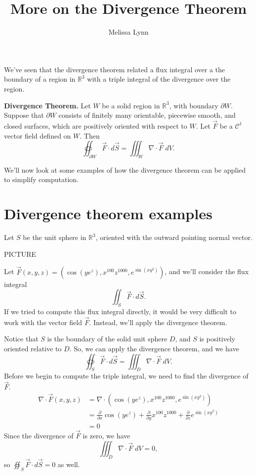 \documentclass{ximera}
\title{More on the Divergence Theorem}
\author{Melissa Lynn}
\begin{document}
  
\begin{abstract}  
\end{abstract}  
\maketitle 

We've seen that the divergence theorem related a flux integral over a the boundary of a region in $\mathbb{R}^3$ with a triple integral of the divergence over the region.

\begin{theorem}
\textbf{Divergence Theorem.} Let $W$ be a solid region in $\mathbb{R}^3$, with boundary $\partial W$. Suppose that $\partial W$ consists of finitely many orientable, piecewise smooth, and closed surfaces, which are positively oriented with respect to $W$. Let $\vec{F}$ be a $\mathcal{C}^1$ vector field defined on $W$. Then
\[
\oiint_{\partial W} \vec{F}\cdot d\vec{S} = \iiint_W \nabla\cdot \vec{F}\;dV.
\]
\end{theorem}

We'll now look at some examples of how the divergence theorem can be applied to simplify computation.

\section*{Divergence theorem examples}

\begin{example}
Let $S$ be the unit sphere in $\mathbb{R}^3$, oriented with the outward pointing normal vector.

PICTURE

Let $\vec{F}(x,y,z) = \left(\cos(ye^z), x^{100}z^{1000}, e^{\sin(xy^2)}\right)$, and we'll consider the flux integral
\[
\iint_S\vec{F}\cdot d\vec{S}.
\]
If we tried to compute this flux integral directly, it would be very difficult to work with the vector field $\vec{F}$. Instead, we'll apply the divergence theorem.

Notice that $S$ is the boundary of the solid unit sphere $D$, and $S$ is positively oriented relative to $D$. So, we can apply the divergence theorem, and we have
\[
\oiint_{S} \vec{F}\cdot d\vec{S} = \iiint_D \nabla\cdot \vec{F}\;dV.
\]
Before we begin to compute the triple integral, we need to find the divergence of $\vec{F}$.
\begin{align*}
\nabla\cdot \vec{F}(x,y,z) &= \nabla \cdot \left(\cos(ye^z), x^{100}z^{1000}, e^{\sin(xy^2)}\right)\\
&= \frac{\partial}{\partial x}\cos(ye^z) + \frac{\partial}{\partial y}x^{100}z^{1000} +  \frac{\partial}{\partial z}e^{\sin(xy^2)}\\
&= 0
\end{align*}
Since the divergence of $\vec{F}$ is zero, we have
\[
 \iiint_D \nabla\cdot \vec{F}\;dV = 0,
\]
so $\oiint_{S} \vec{F}\cdot d\vec{S}  = 0$ as well. 
\end{example}
\end{document}
